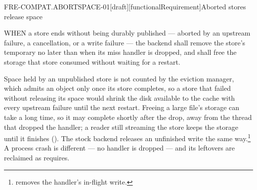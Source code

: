 \begin{requirement}{FRE-COMPAT.ABORTSPACE-01}[draft][functionalRequirement]{Aborted stores release space}


  WHEN a store ends without being durably published --- aborted by an
  upstream failure, a cancellation, or a write failure --- the backend shall
  remove the store's temporary no later than when its miss handler is
  dropped, and shall free the storage that store consumed without waiting for
  a restart.

  Space held by an unpublished store is not counted by the eviction manager,
  which admits an object only once its store completes, so a store that
  failed without releasing its space would shrink the disk available to the
  cache with every upstream failure until the next restart. Freeing a
  large file's storage can take a long time, so it may complete
  shortly after the drop, away from the thread that dropped the handler; a
  reader still streaming the store keeps the storage until it finishes
  (). The stock
  backend releases an unfinished write the same
  way.\footnote{
  removes the handler's in-flight write.} A process crash is different ---
  no handler is dropped --- and its leftovers are reclaimed as
   requires.



\end{requirement}

